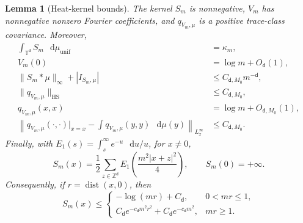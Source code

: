 \documentclass[11pt,reqno]{amsart}
\numberwithin{equation}{section}
\theoremstyle{plain}
\newtheorem{lemma}[lemma]{Lemma}
\theoremstyle{definition}
\renewcommand{\d}{\mathsf d}
\newcommand{\dd}{\mathop{}\!\mathrm d}
\newcommand{\T}{\mathbb T}
\newcommand{\Z}{\mathbb Z}
\newcommand{\HS}{\mathrm{HS}}
\newcommand{\muunif}{\mu_{\mathrm{unif}}}
\begin{document}
\begin{lemma}[Heat-kernel bounds]\label{rep:lem:heat-split-bounds}
The kernel $S_m$ is nonnegative, $V_m$ has nonnegative nonzero Fourier coefficients, and $q_{V_m,\mu}$ is a positive trace-class covariance.  Moreover,
\begin{align}
 \int_{\T^{\d}}S_m\,\dd\muunif&=\kappa_m,\label{rep:eq:Sm-mass}\\
 V_m(0)&=\log m+O_{\d}(1),\label{rep:eq:Vm-diagonal}\\
 \|S_m*\mu\|_\infty+|I_{S_m,\mu}|&\le C_{\d,M_0}m^{-\d},\label{rep:eq:Sm-centering}\\
 \|q_{V_m,\mu}\|_{\HS}&\le C_{\d,M_0},\label{rep:eq:Vm-HS}\\
 q_{V_m,\mu}(x,x)&=\log m+O_{\d,M_0}(1),\label{rep:eq:Vm-centered-diagonal}\\
 \left\|q_{V_m,\mu}(\cdot,\cdot)\big|_{x=x}
 -\int q_{V_m,\mu}(y,y)\,\dd\mu(y)\right\|_{L^\infty_x}
 &\le C_{\d,M_0}.
 \label{rep:eq:Vm-diagonal-oscillation}
\end{align}
Finally, with $E_1(s)=\int_s^\infty e^{-u}\,\dd u/u$, for $x\ne0$,
\begin{equation}\label{rep:eq:Sm-E1}
 S_m(x)=\frac12\sum_{z\in\Z^{\d}}
 E_1\left(\frac{m^2|x+z|^2}{4}\right),
 \qquad S_m(0)=+\infty.
\end{equation}
Consequently, if $r=\operatorname{dist}(x,0)$, then
\begin{equation}\label{rep:eq:Sm-pointwise}
 S_m(x)\le
 \begin{cases}
 -\log(mr)+C_{\d},&0<mr\le1,\\
 C_{\d}e^{-c_{\d}m^2r^2}+C_{\d}e^{-c_{\d}m^2},&mr\ge1.
 \end{cases}
\end{equation}
\end{lemma}
\end{document}
